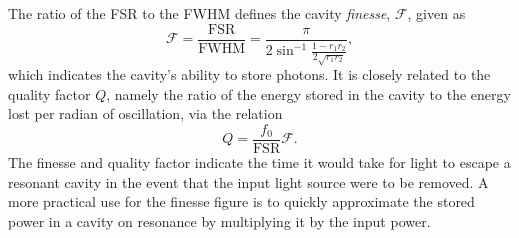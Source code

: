 The ratio of the \gls{FSR} to the \gls{FWHM} defines the cavity \emph{finesse}, $\mathcal{F}$, given as
\begin{equation}
  \mathcal{F} = \frac{\text{FSR}}{\text{FWHM}} = \frac{\pi}{2 \sin^{-1}{\frac{1 - r_1 r_2}{2 \sqrt{r_1 r_2}}}},
\end{equation}
which indicates the cavity's ability to store photons. It is closely related to the quality factor $Q$, namely the ratio of the energy stored in the cavity to the energy lost per radian of oscillation, via the relation~\cite{Band2006}
\begin{equation}
Q = \frac{f_0}{\text{FSR}} \mathcal{F}.
\end{equation}
The finesse and quality factor indicate the time it would take for light to escape a resonant cavity in the event that the input light source were to be removed. A more practical use for the finesse figure is to quickly approximate the stored power in a cavity on resonance by multiplying it by the input power.

